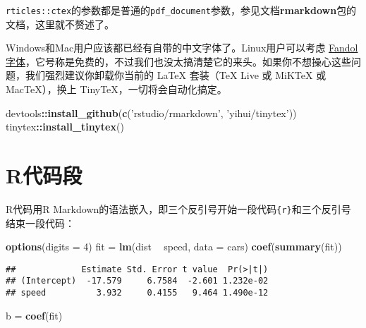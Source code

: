 \documentclass[hyperref,]{ctexart}
\newenvironment{Shaded}{\begin{snugshade}}{\end{snugshade}}
\newcommand{\DataTypeTok}[1]{\textcolor[rgb]{0.13,0.29,0.53}{#1}}
\newcommand{\DecValTok}[1]{\textcolor[rgb]{0.00,0.00,0.81}{#1}}
\newcommand{\KeywordTok}[1]{\textcolor[rgb]{0.13,0.29,0.53}{\textbf{#1}}}
\newcommand{\NormalTok}[1]{#1}
\newcommand{\OperatorTok}[1]{\textcolor[rgb]{0.81,0.36,0.00}{\textbf{#1}}}
\newcommand{\StringTok}[1]{\textcolor[rgb]{0.31,0.60,0.02}{#1}}
\begin{document}
\texttt{rticles::ctex}的参数都是普通的\texttt{pdf\_document}参数，参见文档\textbf{rmarkdown}包的文档，这里就不赘述了。

Windows和Mac用户应该都已经有自带的中文字体了。Linux用户可以考虑
\href{http://ctan.org/pkg/fandol}{Fandol字体}，它号称是免费的，不过我们也没太搞清楚它的来头。如果你不想操心这些问题，我们强烈建议你卸载你当前的
LaTeX 套装（TeX Live 或 MiKTeX 或 MacTeX），换上
TinyTeX，一切将会自动化搞定。

\begin{Shaded}
\begin{Highlighting}[]
\NormalTok{devtools}\OperatorTok{::}\KeywordTok{install_github}\NormalTok{(}\KeywordTok{c}\NormalTok{(}\StringTok{'rstudio/rmarkdown'}\NormalTok{, }\StringTok{'yihui/tinytex'}\NormalTok{))}
\NormalTok{tinytex}\OperatorTok{::}\KeywordTok{install_tinytex}\NormalTok{()}
\end{Highlighting}
\end{Shaded}

\hypertarget{rux4ee3ux7801ux6bb5}{%
\section{R代码段}\label{rux4ee3ux7801ux6bb5}}

R代码用R
Markdown的语法嵌入，即三个反引号开始一段代码\texttt{\textasciigrave{}\textasciigrave{}\textasciigrave{}\{r\}}和三个反引号\texttt{\textasciigrave{}\textasciigrave{}\textasciigrave{}}
结束一段代码：

\begin{Shaded}
\begin{Highlighting}[]
\KeywordTok{options}\NormalTok{(}\DataTypeTok{digits =} \DecValTok{4}\NormalTok{)}
\NormalTok{fit =}\StringTok{ }\KeywordTok{lm}\NormalTok{(dist }\OperatorTok{~}\StringTok{ }\NormalTok{speed, }\DataTypeTok{data =}\NormalTok{ cars)}
\KeywordTok{coef}\NormalTok{(}\KeywordTok{summary}\NormalTok{(fit))}
\end{Highlighting}
\end{Shaded}

\begin{verbatim}
##             Estimate Std. Error t value  Pr(>|t|)
## (Intercept)  -17.579     6.7584  -2.601 1.232e-02
## speed          3.932     0.4155   9.464 1.490e-12
\end{verbatim}

\begin{Shaded}
\begin{Highlighting}[]
\NormalTok{b =}\StringTok{ }\KeywordTok{coef}\NormalTok{(fit)}
\end{Highlighting}
\end{Shaded}
\end{document}
